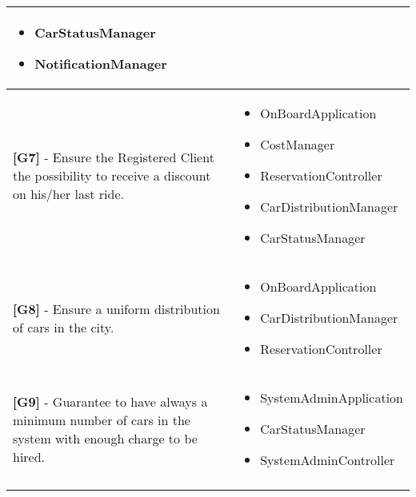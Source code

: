 \begin{longtable}{|l|l|}
\begin{minipage}[t]{0.45\textwidth}
\begin{itemize}
\item CarStatusManager
\item NotificationManager
\end{itemize}
\end{minipage} \\ \hline
\begin{minipage}[t]{0.5\textwidth}
\textbf{[G7]} - Ensure the Registered Client the possibility to receive a discount on his/her last ride.
\end{minipage} &
\begin{minipage}[t]{0.45\textwidth}
\begin{itemize}
\item OnBoardApplication
\item CostManager
\item ReservationController
\item CarDistributionManager
\item CarStatusManager
\end{itemize}
\end{minipage} \\ \hline
\begin{minipage}[t]{0.5\textwidth}
\textbf{[G8]} - Ensure a uniform distribution of cars in the city.
\end{minipage} &
\begin{minipage}[t]{0.45\textwidth}
\begin{itemize}
\item OnBoardApplication
\item CarDistributionManager
\item ReservationController
\end{itemize}
\end{minipage} \\ \hline
\begin{minipage}[t]{0.5\textwidth}
\textbf{[G9]} - Guarantee to have always a minimum number of cars in the system with enough charge to be hired.
\end{minipage} &
\begin{minipage}[t]{0.45\textwidth}
\begin{itemize}
\item SystemAdminApplication
\item CarStatusManager
\item SystemAdminController
\end{itemize}
\end{minipage} \\ \hline
\begin{minipage}[t]{0.5\textwidth}

\end{minipage}
\end{longtable}

